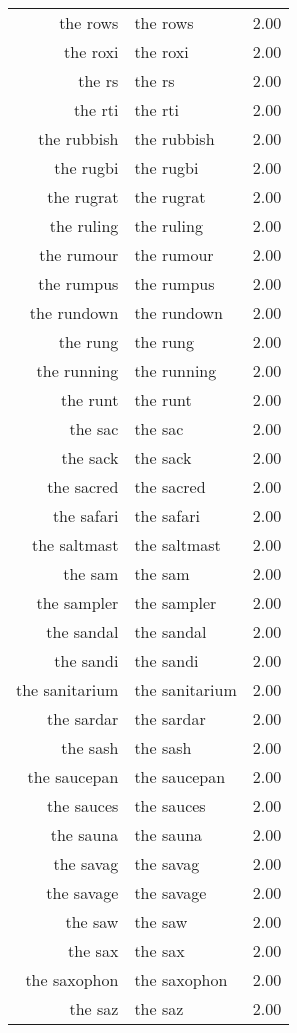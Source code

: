 \begin{table}[ht]
\begin{tabular}{rlr}
  the rows & the rows & 2.00 \\ 
  the roxi & the roxi & 2.00 \\ 
  the rs & the rs & 2.00 \\ 
  the rti & the rti & 2.00 \\ 
  the rubbish & the rubbish & 2.00 \\ 
  the rugbi & the rugbi & 2.00 \\ 
  the rugrat & the rugrat & 2.00 \\ 
  the ruling & the ruling & 2.00 \\ 
  the rumour & the rumour & 2.00 \\ 
  the rumpus & the rumpus & 2.00 \\ 
  the rundown & the rundown & 2.00 \\ 
  the rung & the rung & 2.00 \\ 
  the running & the running & 2.00 \\ 
  the runt & the runt & 2.00 \\ 
  the sac & the sac & 2.00 \\ 
  the sack & the sack & 2.00 \\ 
  the sacred & the sacred & 2.00 \\ 
  the safari & the safari & 2.00 \\ 
  the saltmast & the saltmast & 2.00 \\ 
  the sam & the sam & 2.00 \\ 
  the sampler & the sampler & 2.00 \\ 
  the sandal & the sandal & 2.00 \\ 
  the sandi & the sandi & 2.00 \\ 
  the sanitarium & the sanitarium & 2.00 \\ 
  the sardar & the sardar & 2.00 \\ 
  the sash & the sash & 2.00 \\ 
  the saucepan & the saucepan & 2.00 \\ 
  the sauces & the sauces & 2.00 \\ 
  the sauna & the sauna & 2.00 \\ 
  the savag & the savag & 2.00 \\ 
  the savage & the savage & 2.00 \\ 
  the saw & the saw & 2.00 \\ 
  the sax & the sax & 2.00 \\ 
  the saxophon & the saxophon & 2.00 \\ 
  the saz & the saz & 2.00 \\ 

\end{tabular}
\end{table}
